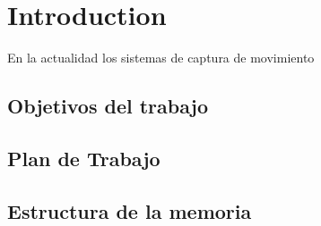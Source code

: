 %
%


\chapter{Introduction}
\label{cap2:sec:introduction}

En la actualidad los sistemas de captura de movimiento 


\section{Objetivos del trabajo}

\section{Plan de Trabajo}

\section{Estructura de la memoria}